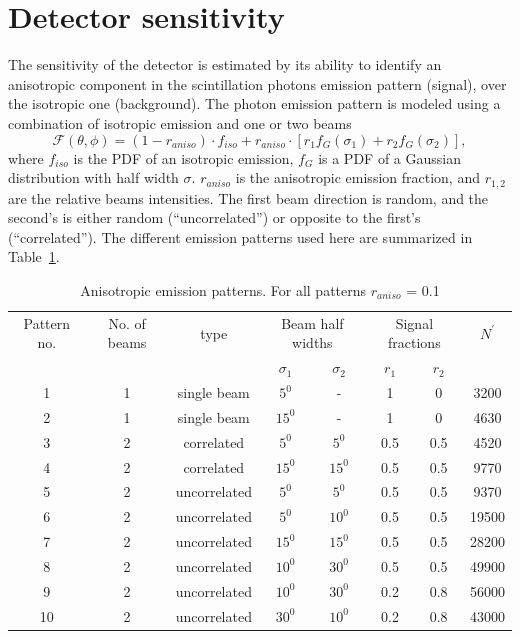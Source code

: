 \section{Detector sensitivity}
\label{sec:sim}
The sensitivity of the detector is estimated by its ability to identify an anisotropic component in the scintillation photons emission pattern (signal), over the isotropic one (background). The photon emission pattern is modeled using a combination of isotropic emission and one or two beams
\begin{equation}
\mathcal{F}(\theta,\phi) = (1-r_{aniso}) \cdot f_{iso} + r_{aniso}\cdot\left[r_1 f_G(\sigma_1) + r_2 f_G(\sigma_2) \right], 
\end{equation}  
where  $f_{iso}$ is the PDF of an isotropic emission, $f_G$ is a PDF of a Gaussian distribution with half width $\sigma$. $r_{aniso}$ is the anisotropic emission fraction, and $r_{1,2}$ are the relative beams intensities. The first beam direction is random, and the second's is either random 
(``uncorrelated'') or opposite to the first's (``correlated''). The different emission patterns used here are summarized in Table~\ref{tab:AnisoPattern}.
 
\begin{table}[h]
  \centering
  \begin{tabular}{|c |c |c|cc|cc|c|}
  \hline
  Pattern no. & No. of beams & type & \multicolumn{2}{c|}{Beam half widths}& \multicolumn{2}{c|}{Signal fractions} & $N^{'}$ \\
  &              &      &  $\sigma_1$ & $\sigma_2$   &  $r_1$ & $r_2$ &   \\
  \hline
  1 & 1 & single beam & $5^{0}$ & - & 1 & 0 & 3200\\
   2 & 1 & single beam & $15^{0}$ & - & 1 & 0 & 4630\\
   3 & 2 & correlated & $5^{0}$ & $5^{0}$ & 0.5 & 0.5 &  4520  \\
   4 & 2 & correlated & $15^{0}$ & $15^{0}$ & 0.5 & 0.5 & 9770  \\
   5 & 2 & uncorrelated & $5^{0}$ & $5^{0}$ & 0.5 & 0.5 & 9370\\
   6 & 2 & uncorrelated & $5^{0}$ & $10^{0}$ & 0.5 & 0.5 & 19500\\
   7 & 2 & uncorrelated & $15^{0}$ & $15^{0}$ & 0.5 & 0.5 & 28200\\
   8 & 2 & uncorrelated & $10^{0}$ & $30^{0}$ & 0.5 & 0.5 & 49900\\
   9 & 2 & uncorrelated & $10^{0}$ & $30^{0}$ & 0.2 & 0.8 & 56000\\
    10 & 2 & uncorrelated & $30^{0}$ & $10^{0}$ & 0.2 & 0.8 & 43000\\
  \hline
 \end{tabular}
   \caption{Anisotropic emission patterns. For all patterns $r_{aniso}$ = 0.1}
  \label{tab:AnisoPattern}

\end{table} 
 
